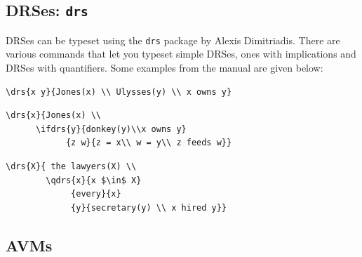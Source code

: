 \subsection{DRSes: \texttt{drs}}

DRSes can be typeset using the \texttt{drs} package by Alexis Dimitriadis. There are various commands that let you typeset simple DRSes, ones with implications
and DRSes with quantifiers. Some examples from the manual are given below:

\bigskip


\begin{verbatim}
\drs{x y}{Jones(x) \\ Ulysses(y) \\ x owns y}
\end{verbatim}



\begin{verbatim}
\drs{x}{Jones(x) \\
      \ifdrs{y}{donkey(y)\\x owns y}
            {z w}{z = x\\ w = y\\ z feeds w}}
\end{verbatim}


\begin{verbatim}
\drs{X}{ the lawyers(X) \\
        \qdrs{x}{x $\in$ X}
             {every}{x}
             {y}{secretary(y) \\ x hired y}}
\end{verbatim}


\subsection{AVMs}

